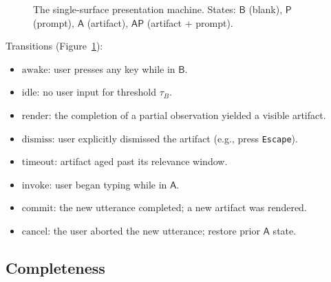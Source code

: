 \documentclass[11pt,a4paper]{article}
\theoremstyle{definition}
\theoremstyle{remark}
\begin{document}
\begin{figure}[t]
\centering
{}
\caption{The single-surface presentation machine. States: $\mathsf{B}$ (blank), $\mathsf{P}$ (prompt), $\mathsf{A}$ (artifact), $\mathsf{AP}$ (artifact + prompt).}
\label{fig:ssp}
\end{figure}

Transitions (Figure~\ref{fig:ssp}):
\begin{itemize}
    \item $\text{awake}$: user presses any key while in $\mathsf{B}$.
    \item $\text{idle}$: no user input for threshold $\tau_B$.
    \item $\text{render}$: the completion of a partial observation yielded a visible artifact.
    \item $\text{dismiss}$: user explicitly dismissed the artifact (e.g., press \texttt{Escape}).
    \item $\text{timeout}$: artifact aged past its relevance window.
    \item $\text{invoke}$: user began typing while in $\mathsf{A}$.
    \item $\text{commit}$: the new utterance completed; a new artifact was rendered.
    \item $\text{cancel}$: the user aborted the new utterance; restore prior $\mathsf{A}$ state.
\end{itemize}

\subsection{Completeness}
\end{document}
